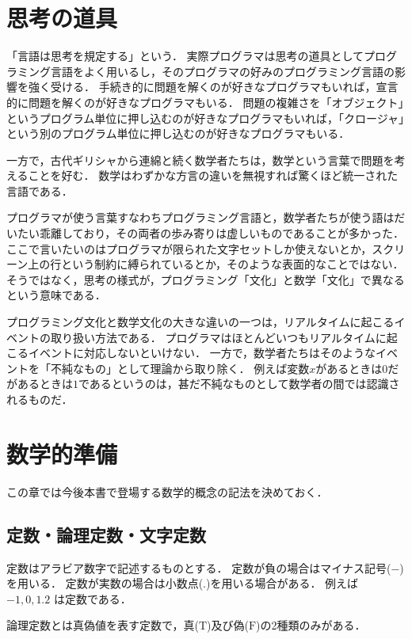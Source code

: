 \documentclass[twocolumn]{jsbook}
\newcommand{\falsevalue}{\text{F}}
\newcommand{\truevalue}{\text{T}}
\begin{document}
\chapter{思考の道具}

「言語は思考を規定する」という．
実際プログラマは思考の道具としてプログラミング言語をよく用いるし，そのプログラマの好みのプログラミング言語の影響を強く受ける．
手続き的に問題を解くのが好きなプログラマもいれば，宣言的に問題を解くのが好きなプログラマもいる．
問題の複雑さを「オブジェクト」というプログラム単位に押し込むのが好きなプログラマもいれば，「クロージャ」という別のプログラム単位に押し込むのが好きなプログラマもいる．

一方で，古代ギリシャから連綿と続く数学者たちは，数学という言葉で問題を考えることを好む．
数学はわずかな方言の違いを無視すれば驚くほど統一された言語である．

プログラマが使う言葉すなわちプログラミング言語と，数学者たちが使う語はだいたい乖離しており，その両者の歩み寄りは虚しいものであることが多かった．
ここで言いたいのはプログラマが限られた文字セットしか使えないとか，スクリーン上の行という制約に縛られているとか，そのような表面的なことではない．
そうではなく，思考の様式が，プログラミング「文化」と数学「文化」で異なるという意味である．

プログラミング文化と数学文化の大きな違いの一つは，リアルタイムに起こるイベントの取り扱い方法である．
プログラマはほとんどいつもリアルタイムに起こるイベントに対応しないといけない．
一方で，数学者たちはそのようなイベントを「不純なもの」として理論から取り除く．
例えば変数$x$があるときは$0$だがあるときは$1$であるというのは，甚だ不純なものとして数学者の間では認識されるものだ．

\chapter{数学的準備}

この章では今後本書で登場する数学的概念の記法を決めておく．

\section{定数・論理定数・文字定数}

定数はアラビア数字で記述するものとする．
定数が負の場合はマイナス記号($-$)を用いる．
定数が実数の場合は小数点($.$)を用いる場合がある．
例えば $-1, 0, 1.2$ は定数である．

論理定数とは真偽値を表す定数で，真($\truevalue$)及び偽($\falsevalue$)の2種類のみがある．
\end{document}
